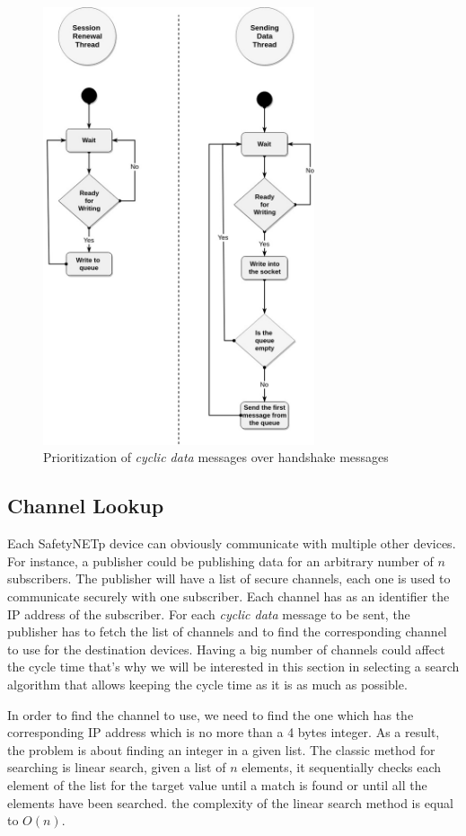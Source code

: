 \begin{figure}[H]
\centering
\includegraphics[width=8cm]{figures/realization/mutex_write_socket.jpg}
\caption{Prioritization of \textit{cyclic data} messages over handshake messages}\label{write_to_queue}
\end{figure}

\subsection{Channel Lookup}

Each SafetyNETp device can obviously communicate with multiple other devices. For instance, a publisher could
be publishing data for an arbitrary number of $n$ subscribers. The publisher will have a list of secure channels, each one is used
to communicate securely with one subscriber. Each channel has as an identifier the IP address of the subscriber.
For each \textit{cyclic data} message to be sent, the publisher has to fetch the list of channels and to find
the corresponding channel to use for the destination devices. Having a big number of channels
could affect the cycle time that’s why we will be interested in this section in selecting a search
algorithm that allows keeping the cycle time as it is as much as possible.

In order to find the channel to use, we need to find the one which has the corresponding IP address which is no
more than a 4 bytes integer. As a result, the problem is about finding an integer in a given list.
The classic method for searching is linear search, given a list of $n$ elements, it sequentially checks
each element of the list for the target value until a match is found or until all the elements have been
searched. the complexity of the linear search method is equal to $O(n)$.

